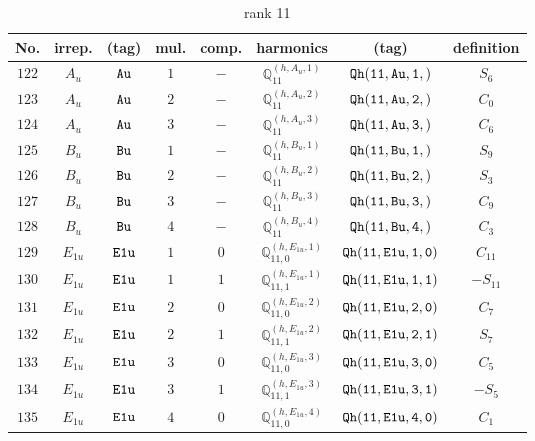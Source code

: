 \documentclass[fleqn,8pt]{jsarticle}
\begin{document}
\begin{table}[ht!]
\begin{center}
\caption{rank 11}
\renewcommand{\arraystretch}{1.3}
\begin{tabular}{cccccccc} \hline \hline
No. & irrep. & (tag) & mul. & comp. & harmonics & (tag) & definition \\ \hline
$ 122 $ & $ A_{u} $ & $ {\tt Au} $ & $ 1 $ & $ - $ & $ \mathbb{Q}_{11}^{(h,A_{u},1)} $ & $ {\tt Qh(11,Au,1,)} $ & $ S_{6} $ \\
$ 123 $ & $ A_{u} $ & $ {\tt Au} $ & $ 2 $ & $ - $ & $ \mathbb{Q}_{11}^{(h,A_{u},2)} $ & $ {\tt Qh(11,Au,2,)} $ & $ C_{0} $ \\
$ 124 $ & $ A_{u} $ & $ {\tt Au} $ & $ 3 $ & $ - $ & $ \mathbb{Q}_{11}^{(h,A_{u},3)} $ & $ {\tt Qh(11,Au,3,)} $ & $ C_{6} $ \\
$ 125 $ & $ B_{u} $ & $ {\tt Bu} $ & $ 1 $ & $ - $ & $ \mathbb{Q}_{11}^{(h,B_{u},1)} $ & $ {\tt Qh(11,Bu,1,)} $ & $ S_{9} $ \\
$ 126 $ & $ B_{u} $ & $ {\tt Bu} $ & $ 2 $ & $ - $ & $ \mathbb{Q}_{11}^{(h,B_{u},2)} $ & $ {\tt Qh(11,Bu,2,)} $ & $ S_{3} $ \\
$ 127 $ & $ B_{u} $ & $ {\tt Bu} $ & $ 3 $ & $ - $ & $ \mathbb{Q}_{11}^{(h,B_{u},3)} $ & $ {\tt Qh(11,Bu,3,)} $ & $ C_{9} $ \\
$ 128 $ & $ B_{u} $ & $ {\tt Bu} $ & $ 4 $ & $ - $ & $ \mathbb{Q}_{11}^{(h,B_{u},4)} $ & $ {\tt Qh(11,Bu,4,)} $ & $ C_{3} $ \\
$ 129 $ & $ E_{1u} $ & $ {\tt E1u} $ & $ 1 $ & $ 0 $ & $ \mathbb{Q}_{11,0}^{(h,E_{1u},1)} $ & $ {\tt Qh(11,E1u,1,0)} $ & $ C_{11} $ \\
$ 130 $ & $ E_{1u} $ & $ {\tt E1u} $ & $ 1 $ & $ 1 $ & $ \mathbb{Q}_{11,1}^{(h,E_{1u},1)} $ & $ {\tt Qh(11,E1u,1,1)} $ & $ - S_{11} $ \\
$ 131 $ & $ E_{1u} $ & $ {\tt E1u} $ & $ 2 $ & $ 0 $ & $ \mathbb{Q}_{11,0}^{(h,E_{1u},2)} $ & $ {\tt Qh(11,E1u,2,0)} $ & $ C_{7} $ \\
$ 132 $ & $ E_{1u} $ & $ {\tt E1u} $ & $ 2 $ & $ 1 $ & $ \mathbb{Q}_{11,1}^{(h,E_{1u},2)} $ & $ {\tt Qh(11,E1u,2,1)} $ & $ S_{7} $ \\
$ 133 $ & $ E_{1u} $ & $ {\tt E1u} $ & $ 3 $ & $ 0 $ & $ \mathbb{Q}_{11,0}^{(h,E_{1u},3)} $ & $ {\tt Qh(11,E1u,3,0)} $ & $ C_{5} $ \\
$ 134 $ & $ E_{1u} $ & $ {\tt E1u} $ & $ 3 $ & $ 1 $ & $ \mathbb{Q}_{11,1}^{(h,E_{1u},3)} $ & $ {\tt Qh(11,E1u,3,1)} $ & $ - S_{5} $ \\
$ 135 $ & $ E_{1u} $ & $ {\tt E1u} $ & $ 4 $ & $ 0 $ & $ \mathbb{Q}_{11,0}^{(h,E_{1u},4)} $ & $ {\tt Qh(11,E1u,4,0)} $ & $ C_{1} $ \\

\end{tabular}
\end{center}
\end{table}
\end{document}
